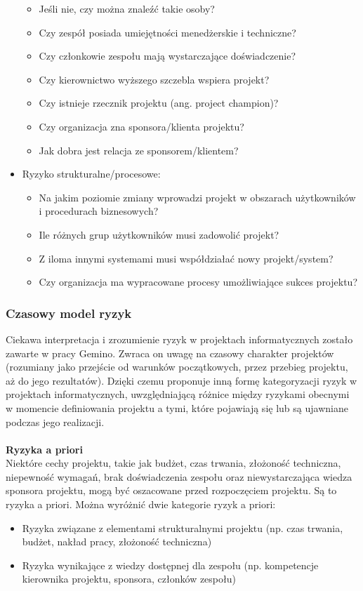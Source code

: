 \begin{itemize}
\begin{itemize}
        \item Jeśli nie, czy można znaleźć takie osoby?
        \item Czy zespół posiada umiejętności menedżerskie i techniczne?
        \item Czy członkowie zespołu mają wystarczające doświadczenie?
        \item Czy kierownictwo wyższego szczebla wspiera projekt?
        \item Czy istnieje rzecznik projektu (ang. project champion)?
        \item Czy organizacja zna sponsora/klienta projektu?
        \item Jak dobra jest relacja ze sponsorem/klientem?
    \end{itemize}
    \item Ryzyko strukturalne/procesowe:
    \begin{itemize}
        \item Na jakim poziomie zmiany wprowadzi projekt w obszarach użytkowników i procedurach biznesowych?
        \item Ile różnych grup użytkowników musi zadowolić projekt?
        \item Z iloma innymi systemami musi współdziałać nowy projekt/system?
        \item Czy organizacja ma wypracowane procesy umożliwiające sukces projektu?
    \end{itemize}
\end{itemize}

\subsubsection{Czasowy model ryzyk}
Ciekawa interpretacja i zrozumienie ryzyk w projektach informatycznych zostało zawarte w pracy Gemino.\autocite{ryzyka} Zwraca on uwagę na czasowy charakter projektów (rozumiany jako przejście od warunków początkowych, przez przebieg projektu, aż do jego rezultatów). Dzięki czemu proponuje inną formę kategoryzacji ryzyk w projektach informatycznych, uwzględniającą różnice między ryzykami obecnymi w momencie definiowania projektu a tymi, które pojawiają się lub są ujawniane podczas jego realizacji.
\\
\\
\textbf{Ryzyka a priori}\\
Niektóre cechy projektu, takie jak budżet, czas trwania, złożoność techniczna, niepewność wymagań, brak doświadczenia zespołu oraz niewystarczająca wiedza sponsora projektu, mogą być oszacowane przed rozpoczęciem projektu. Są to ryzyka a priori.
Można wyróżnić dwie kategorie ryzyk a priori:
\begin{itemize}
    \item Ryzyka związane z elementami strukturalnymi projektu (np. czas trwania, budżet, nakład pracy, złożoność techniczna)
    \item Ryzyka wynikające z wiedzy dostępnej dla zespołu (np. kompetencje kierownika projektu, sponsora, członków zespołu)
\end{itemize}

